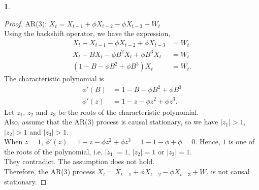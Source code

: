 \documentclass[10pt]{article}
\newtheorem{prob}{\bm{$Problem$}}
\begin{document}
\begin{prob}
\end{prob}
\vspace{3mm}
\begin{proof}
AR(3): $X_t=X_{t-1}+\phi{X_{t-2}}-\phi{X_{t-3}}+W_t$\\
Using the backshift operator, we have the expression,
\begin{align*}
X_t-X_{t-1}-\phi{X_{t-2}}+\phi{X_{t-3}}&=W_t\\
X_t-BX_t-\phi{B^2}X_t+\phi{B^3}X_t&=W_t\\
(1-B-\phi{B^2}+\phi{B^3})X_t&=W_t.
\end{align*}
The characteristic polynomial is
\begin{align*}
\phi'(B)&=1-B-\phi{B^2}+\phi{B^3}\\
\phi'(z)&=1-z-\phi{z^2}+\phi{z^3}.
\end{align*}
Let $z_1$, $z_2$ and $z_3$ be the roots of the characteristic polynomial.\\
Also, assume that the AR(3) process is causal stationary, so we have $|z_1|>1$, $|z_2|>1$ and $|z_3|>1$.\\
When $z=1$, $\phi'(z)=1-z-\phi{z^2}+\phi{z^3}=1-1-\phi+\phi=0$. Hence, $1$ is one of the roots of the polynomial, i.e. $|z_1|=1$, $|z_2|=1$ or $|z_3|=1$.\\
They contradict. The assumption does not hold.\\
Therefore, the AR(3) process $X_t=X_{t-1}+\phi{X_{t-2}}-\phi{X_{t-3}}+W_t$ is not causal stationary.
\end{proof}
\vspace{3mm}
\end{document}
